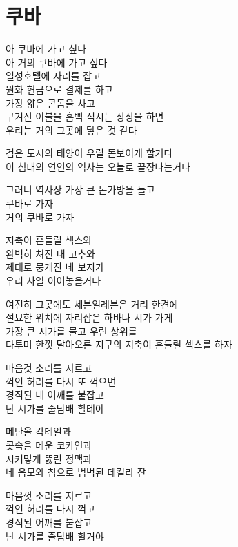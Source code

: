 \documentclass[12pt, b6paper, openany]{memoir}
\newenvironment{article}{}{}
\begin{document}
\begin{article}
\hypertarget{uxcfe0uxbc14}{%
\chapter{쿠바}\label{uxcfe0uxbc14}}

아 쿠바에 가고 싶다\\
아 거의 쿠바에 가고 싶다\\
일성호텔에 자리를 잡고\\
원화 현금으로 결제를 하고\\
가장 얇은 콘돔을 사고\\
구겨진 이불을 흠뻑 적시는 상상을 하면\\
우리는 거의 그곳에 닿은 것 같다

검은 도시의 태양이 우릴 돋보이게 할거다\\
이 침대의 연인의 역사는 오늘로 끝장나는거다

그러니 역사상 가장 큰 돈가방을 들고\\
쿠바로 가자\\
거의 쿠바로 가자

지축이 흔들릴 섹스와\\
완벽히 쳐진 내 고추와\\
제대로 뭉게진 네 보지가\\
우리 사일 이어놓을거다

여전히 그곳에도 세븐일레븐은 거리 한켠에\\
절묘한 위치에 자리잡은 하바나 시가 가게\\
가장 큰 시가를 물고 우린 상위를\\
다투며 한껏 달아오른 지구의 지축이 흔들릴 섹스를 하자

마음것 소리를 지르고\\
꺽인 허리를 다시 또 꺽으면\\
경직된 네 어깨를 붙잡고\\
난 시가를 줄담배 할테야

메탄올 칵테일과\\
콧속을 메운 코카인과\\
시커멓게 뚫린 정맥과\\
네 음모와 침으로 범벅된 데킬라 잔

마음껏 소리를 지르고\\
꺽인 허리를 다시 꺽고\\
경직된 어깨를 붙잡고\\
난 시가를 줄담배 할거야
\end{article}
\end{document}
